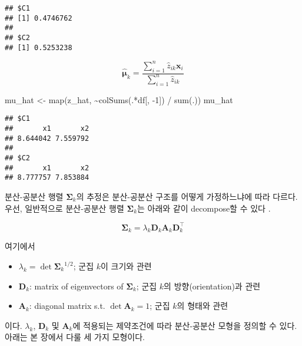 \documentclass[
]{book}
\newenvironment{Shaded}{\begin{snugshade}}{\end{snugshade}}
\newcommand{\DecValTok}[1]{\textcolor[rgb]{0.00,0.00,0.81}{#1}}
\newcommand{\FunctionTok}[1]{\textcolor[rgb]{0.00,0.00,0.00}{#1}}
\newcommand{\NormalTok}[1]{#1}
\newcommand{\OtherTok}[1]{\textcolor[rgb]{0.56,0.35,0.01}{#1}}
\newcommand{\SpecialCharTok}[1]{\textcolor[rgb]{0.00,0.00,0.00}{#1}}
\providecommand{\tightlist}{%
  \setlength{\itemsep}{0pt}\setlength{\parskip}{0pt}}
\begin{document}
\begin{verbatim}
## $C1
## [1] 0.4746762
## 
## $C2
## [1] 0.5253238
\end{verbatim}

\begin{equation*}
\hat{\boldsymbol\mu}_k = \frac{\sum_{i = 1}^{n} \hat{z}_{ik} \mathbf{x}_i}{\sum_{i = 1}^{n} \hat{z}_{ik}}
\end{equation*}

\begin{Shaded}
\begin{Highlighting}[]
\NormalTok{mu\_hat }\OtherTok{\textless{}{-}} \FunctionTok{map}\NormalTok{(z\_hat, }\SpecialCharTok{\textasciitilde{}}\FunctionTok{colSums}\NormalTok{(.}\SpecialCharTok{*}\NormalTok{df[, }\SpecialCharTok{{-}}\DecValTok{1}\NormalTok{]) }\SpecialCharTok{/} \FunctionTok{sum}\NormalTok{(.))}
\NormalTok{mu\_hat}
\end{Highlighting}
\end{Shaded}

\begin{verbatim}
## $C1
##       x1       x2 
## 8.644042 7.559792 
## 
## $C2
##       x1       x2 
## 8.777757 7.853884
\end{verbatim}

분산-공분산 행렬 \(\boldsymbol\Sigma_k\)의 추정은 분산-공분산 구조를 어떻게 가정하느냐에 따라 다르다. 우선, 일반적으로 분산-공분산 행렬 \(\boldsymbol\Sigma_k\)는 아래와 같이 decompose할 수 있다 \citep{banfield1993model}.

\begin{equation*}
\boldsymbol\Sigma_k = \lambda_k \mathbf{D}_k \mathbf{A}_k \mathbf{D}_k^\top
\end{equation*}

여기에서

\begin{itemize}
\tightlist
\item
  \(\lambda_k = \det{\boldsymbol\Sigma_k}^{1 / 2}\); 군집 \(k\)이 크기와 관련
\item
  \(\mathbf{D}_k\): matrix of eigenvectors of \(\boldsymbol\Sigma_k\); 군집 \(k\)의 방향(orientation)과 관련
\item
  \(\mathbf{A}_k\): diagonal matrix s.t. \(\det{\mathbf{A}_k} = 1\); 군집 \(k\)의 형태와 관련
\end{itemize}

이다. \(\lambda_k\), \(\mathbf{D}_k\) 및 \(\mathbf{A}_k\)에 적용되는 제약조건에 따라 분산-공분산 모형을 정의할 수 있다. 아래는 본 장에서 다룰 세 가지 모형이다.
\end{document}
